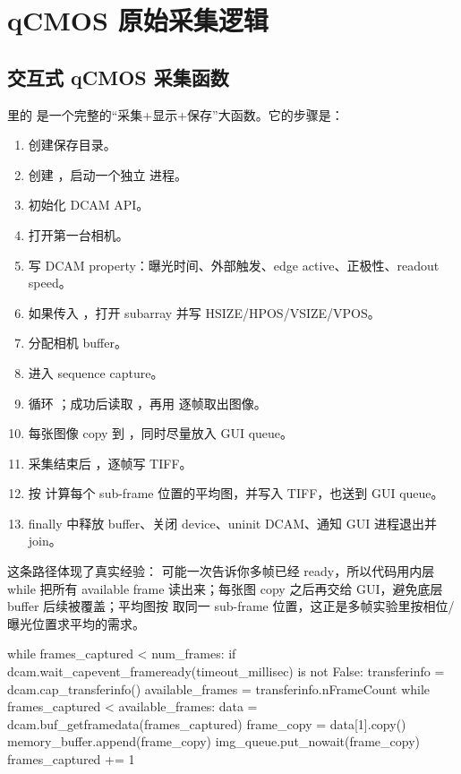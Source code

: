 \documentclass[11pt,oneside,openany]{book}
\begin{document}
\chapter{qCMOS 原始采集逻辑}
\section{交互式 qCMOS 采集函数}
 里的  是一个完整的“采集+显示+保存”大函数。它的步骤是：
\begin{enumerate}
  \item 创建保存目录。
  \item 创建 ，启动一个独立  进程。
  \item {} 初始化 DCAM API。
  \item {} 打开第一台相机。
  \item 写 DCAM property：曝光时间、外部触发、edge active、正极性、readout speed。
  \item 如果传入 ，打开 subarray 并写 HSIZE/HPOS/VSIZE/VPOS。
  \item {} 分配相机 buffer。
  \item {} 进入 sequence capture。
  \item 循环 ；成功后读取 ，再用  逐帧取出图像。
  \item 每张图像 copy 到 ，同时尽量放入 GUI queue。
  \item 采集结束后 ，逐帧写 TIFF。
  \item 按  计算每个 sub-frame 位置的平均图，并写入 TIFF，也送到 GUI queue。
  \item finally 中释放 buffer、关闭 device、uninit DCAM、通知 GUI 进程退出并 join。
\end{enumerate}

这条路径体现了真实经验： 可能一次告诉你多帧已经 ready，所以代码用内层 while 把所有 available frame 读出来；每张图 copy 之后再交给 GUI，避免底层 buffer 后续被覆盖；平均图按  取同一 sub-frame 位置，这正是多帧实验里按相位/曝光位置求平均的需求。

\begin{codeblock}[Python]
while frames_captured < num_frames:
    if dcam.wait_capevent_frameready(timeout_millisec) is not False:
        transferinfo = dcam.cap_transferinfo()
        available_frames = transferinfo.nFrameCount
        while frames_captured < available_frames:
            data = dcam.buf_getframedata(frames_captured)
            frame_copy = data[1].copy()
            memory_buffer.append(frame_copy)
            img_queue.put_nowait(frame_copy)
            frames_captured += 1
\end{codeblock}
\end{document}
